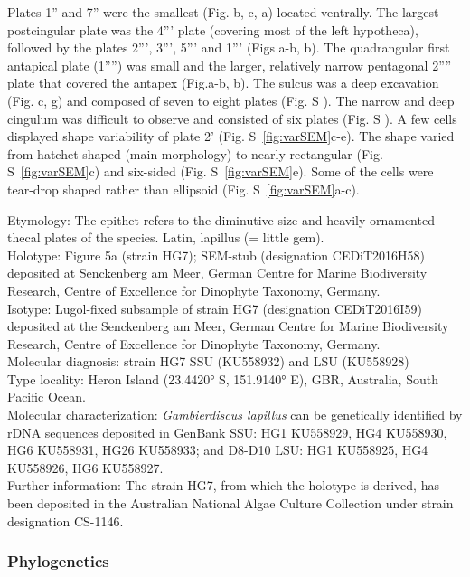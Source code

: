 \documentclass[12pt]{article}
\begin{document}
Plates 1'' and 7'' were the smallest (Fig. b, c, a) located ventrally. %
The largest postcingular plate was the 4''' plate (covering most of the left hypotheca), followed by the plates 2''', 3''', 5''' and 1''' (Figs a-b, b). %
The quadrangular first antapical plate (1'''') was small and the larger, relatively narrow pentagonal 2'''' plate that covered the antapex (Fig.a-b, b). %
The sulcus was a deep excavation (Fig. c, g) and composed of seven to eight plates (Fig. S ). %
The narrow and deep cingulum was difficult to observe and consisted of six plates (Fig. S ). %
A few cells displayed shape variability of plate 2' (Fig. S~\ref{fig:varSEM}c-e). %
The shape varied from hatchet shaped (main morphology) to nearly rectangular (Fig. S~\ref{fig:varSEM}c) and six-sided (Fig. S~\ref{fig:varSEM}e).%
Some of the cells were tear-drop shaped rather than ellipsoid (Fig. S~\ref{fig:varSEM}a-c). %

Etymology: The epithet refers to the diminutive size and heavily ornamented thecal plates of the species. Latin, lapillus (= little gem). \\
Holotype: Figure 5a (strain HG7); SEM-stub (designation CEDiT2016H58) deposited at Senckenberg am Meer, German Centre for Marine Biodiversity Research, Centre of Excellence for Dinophyte Taxonomy, Germany. \\
Isotype: Lugol-fixed subsample of strain HG7 (designation CEDiT2016I59) deposited at the Senckenberg am Meer, German Centre for Marine Biodiversity Research, Centre of Excellence for Dinophyte Taxonomy, Germany. \\
Molecular diagnosis: strain HG7 SSU (KU558932) and LSU (KU558928)\\
Type locality: Heron Island (23.4420° S, 151.9140° E), GBR, Australia, South Pacific Ocean.\\
Molecular characterization: \textit{Gambierdiscus lapillus} can be genetically identified by rDNA sequences deposited in GenBank SSU: HG1 KU558929, HG4 KU558930, HG6 KU558931, HG26 KU558933; and D8-D10 LSU: HG1 KU558925, HG4 KU558926, HG6 KU558927. \\
Further information: The strain HG7, from which the holotype is derived, has been deposited in the Australian National Algae Culture Collection under strain designation CS-1146.

\subsubsection{Phylogenetics}
\end{document}
